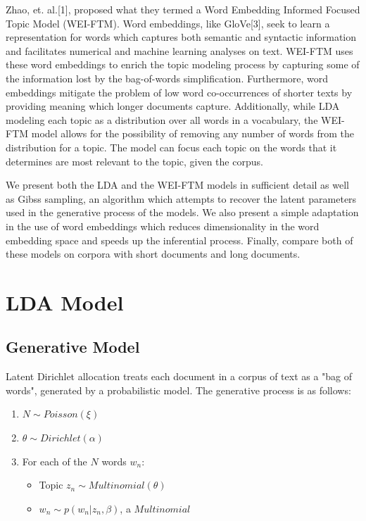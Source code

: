 \documentclass[letterpaper, 11pt]{article}
\begin{document}
\begin{multicols}{2}
Zhao, et. al.[1], proposed what they termed a Word Embedding Informed Focused Topic
Model (WEI-FTM).
Word embeddings, like GloVe[3], seek to learn a representation for words
which captures both semantic and syntactic information and facilitates numerical and machine learning
analyses on text.
WEI-FTM uses these word embeddings to enrich the topic modeling process by capturing some of the
information lost by the bag-of-words simplification.
Furthermore, word embeddings mitigate the problem of low word co-occurrences of shorter texts by
providing meaning which longer documents capture.
Additionally, while LDA modeling each topic as a distribution over all words in a vocabulary,
the WEI-FTM model allows for the possibility of removing any number of words from the distribution
for a topic.
The model can focus each topic on the words that it determines are most relevant to the topic, given
the corpus.

We present both the LDA and the WEI-FTM models in sufficient detail as well as Gibss sampling, an
algorithm which attempts to recover the latent parameters used in the generative process of the
models.
We also present a simple adaptation in the use of word embeddings which reduces dimensionality in
the word embedding space and speeds up the inferential process.
Finally, compare both of these models on corpora with short documents and long documents.

\section{LDA Model}
\subsection{Generative Model}
Latent Dirichlet allocation treats each document in a corpus of text as a "bag of words", generated
by a probabilistic model.
The generative process is as follows:
\begin{enumerate}
	\item $N \sim Poisson(\xi)$
	\item $\theta \sim Dirichlet(\alpha)$
	\item For each of the $N$ words $w_n$:
	\begin{itemize}
		\item Topic $z_n \sim Multinomial(\theta)$ 
		\item $w_n \sim p(w_n | z_n, \beta)$, a $Multinomial$
	\end{itemize}
\end{enumerate}


\end{multicols}
\end{document}
